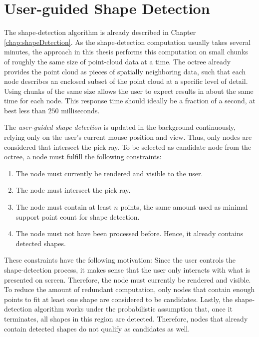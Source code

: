 \section{User-guided Shape Detection}
\label{sec:user_guided_sd}

The shape-detection algorithm is already described in Chapter \ref{chap:shapeDetection}. As the shape-detection computation usually takes several minutes, the approach in this thesis performs this computation on small chunks of roughly the same size of point-cloud data at a time. The octree already provides the point cloud as pieces of spatially neighboring data, such that each node describes an enclosed subset of the point cloud at a specific level of detail. Using chunks of the same size allows the user to expect results in about the same time for each node. This response time should ideally be a fraction of a second, at best less than $250$ milliseconds. 

The \textit{user-guided shape detection} is updated in the background continuously, relying only on the user's current mouse position and view. Thus, only nodes are considered that intersect the pick ray. To be selected as candidate node from the octree, a node must fulfill the following constraints: 

\begin{enumerate}
    \item The node must currently be rendered and visible to the user. 
    \item The node must intersect the pick ray.
    \item The node must contain at least $n$ points, the same amount used as minimal support point count for shape detection.
    \item The node must not have been processed before. Hence, it already contains detected shapes. 
\end{enumerate}

These constraints have the following motivation: Since the user controls the shape-detection process, it makes sense that the user only interacts with what is presented on screen. Therefore, the node must currently be rendered and visible. To reduce the amount of redundant computation, only nodes that contain enough points to fit at least one shape are considered to be candidates. Lastly, the shape-detection algorithm works under the probabilistic assumption that, once it terminates, all shapes in this region are detected. Therefore, nodes that already contain detected shapes do not qualify as candidates as well. 

